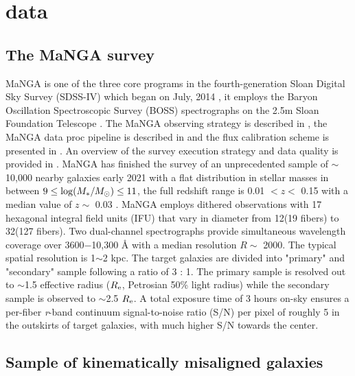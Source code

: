 \section{data}
\label{sec:data}

\subsection{The MaNGA survey}

MaNGA is one of the three core programs in the fourth-generation Sloan Digital Sky Survey (SDSS-IV) which began on July, 2014 \citep{2015ApJ...798....7B, drory_manga_2015}, it employs the Baryon Oscillation Spectroscopic Survey (BOSS) spectrographs \citep{smee_multi-object_2013} on the 2.5m Sloan Foundation Telescope \citep{gunn_25_2006}. The MaNGA observing strategy is described in \citet{law_observing_2015}, the MaNGA data proc pipeline is described in \citet{law_data_2016} and the flux calibration scheme is presented in \citet{yan_sdss-ivmanga_2016}. An overview of the survey execution strategy and data quality is provided in \citet{yan_sdss-iv_2016}. MaNGA has finished the survey of an unprecedented sample of $\sim$10,000 nearby galaxies early 2021 with a flat distribution in stellar masses in between $9 \le {\rm log}(M_*/M_\odot) \le 11$, the full redshift range is 0.01 $< z <$ 0.15 with a median value of $z \sim$ 0.03 \citep{2017AJ....154...86W, blanton_sloan_2017}. MaNGA employs dithered observations with 17 hexagonal integral field units (IFU) that vary in diameter from 12\arcsec (19 fibers) to 32\arcsec (127 fibers). Two dual-channel spectrographs provide simultaneous wavelength coverage over 3600$-$10,300 \r{A} with a median resolution $R \sim$ 2000. The typical spatial resolution is 1$\sim$2 kpc. The target galaxies are divided into "primary" and "secondary" sample following a ratio of 3 : 1. The primary sample is resolved out to $\sim$1.5 effective radius ($R_{\rm e}$, Petrosian 50\% light radius) while the secondary sample is observed to $\sim$2.5 $R_{\rm e}$. A total exposure time of 3 hours on-sky ensures a per-fiber \textit{r}-band continuum signal-to-noise ratio (S/N) per pixel of roughly 5 in the outskirts of target galaxies, with much higher S/N towards the center.

\subsection{Sample of kinematically misaligned galaxies}
\label{sec:Sample of kinematically misaligned galaxies}

